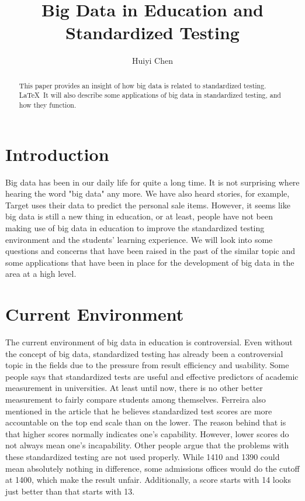 \documentclass[sigconf]{acmart}
\begin{document}
\title{Big Data in Education and Standardized Testing}


\author{Huiyi Chen}



\renewcommand{\shortauthors}{H. CHEN}


\begin{abstract}
This paper provides an insight of how big data is related to standardized testing. \LaTeX\ It will also describe some applications of big data in standardized testing, and how they function.
\end{abstract}



\maketitle

\section{Introduction}

Big data has been in our daily life for quite a long time. It is not surprising where hearing the word "big data" any more. We have also heard stories, for example, Target uses their data to predict the personal sale items. However, it seems like big data is still a new thing in education, or at least, people have not been making use of big data in education to improve the standardized testing environment and the students' learning experience. We will look into some questions and concerns that have been raised in the past of the similar topic and some applications that have been in place for the development of big data in the area at a high level.


\section{Current Environment}
The current environment of big data in education is controversial. Even without the concept of big data, standardized testing has already been a controversial topic in the fields due to the pressure from result efficiency and usability. Some people says that standardized tests are useful and effective predictors of academic measurement in universities. \cite{Ferreira2014}At least until now, there is no other better measurement to fairly compare students among themselves. Ferreira also mentioned in the article that he believes standardized test scores are more accountable on the top end scale than on the lower. The reason behind that is that higher scores normally indicates one's capability. However, lower scores do not always mean one's incapability. \cite{Ferreira2014}
Other people argue that the problems with these standardized testing are not used properly. While 1410 and 1390 could mean absolutely nothing in difference, some admissions offices would do the cutoff at 1400, which make the result unfair. Additionally, a score starts with 14 looks just better than that starts with 13.
\end{document}
